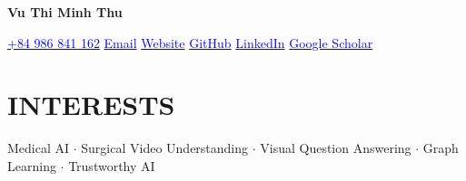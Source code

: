 \documentclass[11pt,a4paper]{article}
\newcommand{\ContactItem}[3]{%
  \href{#2}{\textcolor{black}{#1\hspace{0.25em}\textcolor{blue}{#3}}}}
\newcommand{\documentTitle}[2]{
  \begin{center}
    {\fontsize{22}{26}\selectfont\bfseries\color{accentTitle} #1\par}
    \vspace{0.25em}
    {\small #2\par}
    \vspace{0.3em}
  \end{center}
  \vspace{-0.5em}
}
\begin{document}

  \documentTitle{Vu Thi Minh Thu}{
    \vspace{0.35em}
    {\centering\small
    \ContactItem{\faPhone}{tel:+84986841162}{+84 986 841 162}
    \hspace{0.75em}
    \ContactItem{\faEnvelope}{mailto:vuthiminhthu04@gmail.com}{Email}
    \hspace{0.75em}
    \ContactItem{\faGlobe}{https://thiminhthuvu.github.io/}{Website}
    \hspace{0.75em}
    \ContactItem{\faGithub}{https://github.com/ThiMinhThuVu}{GitHub}
    \hspace{0.75em}
    \ContactItem{\faLinkedin}{https://www.linkedin.com/in/thu-thi-minh-vu/?}{LinkedIn}
    \hspace{0.75em}
    \ContactItem{\faGraduationCap}{https://scholar.google.com/citations?user=Zwbvyq0AAAAJ}{Google Scholar}
    \par}
  }

\section{INTERESTS}


Medical AI $\cdot$ Surgical Video Understanding $\cdot$ Visual Question Answering $\cdot$ Graph Learning $\cdot$ Trustworthy AI
\end{document}
